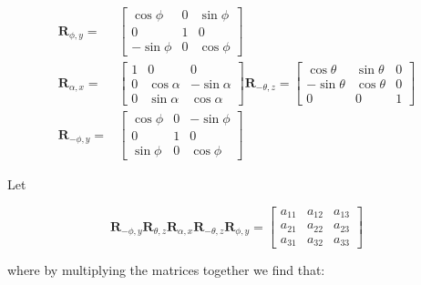 $$
\begin{aligned}
\mathbf{R}_{\phi, y}= & {\left[\begin{array}{ccc}
\cos \phi & 0 & \sin \phi \\
0 & 1 & 0 \\
-\sin \phi & 0 & \cos \phi
\end{array}\right] } \\
\mathbf{R}_{\alpha, x}= & {\left[\begin{array}{ccc}
1 & 0 & 0 \\
0 & \cos \alpha & -\sin \alpha \\
0 & \sin \alpha & \cos \alpha
\end{array}\right] \mathbf{R}_{-\theta, z}=\left[\begin{array}{ccc}
\cos \theta & \sin \theta & 0 \\
-\sin \theta & \cos \theta & 0 \\
0 & 0 & 1
\end{array}\right] } \\
\mathbf{R}_{-\phi, y}= & {\left[\begin{array}{ccc}
\cos \phi & 0 & -\sin \phi \\
0 & 1 & 0 \\
\sin \phi & 0 & \cos \phi
\end{array}\right] }
\end{aligned}
$$

Let

$$
\mathbf{R}_{-\phi, y} \mathbf{R}_{\theta, z} \mathbf{R}_{\alpha, x} \mathbf{R}_{-\theta, z} \mathbf{R}_{\phi, y}=\left[\begin{array}{lll}
a_{11} & a_{12} & a_{13} \\
a_{21} & a_{22} & a_{23} \\
a_{31} & a_{32} & a_{33}
\end{array}\right]
$$

where by multiplying the matrices together we find that:

